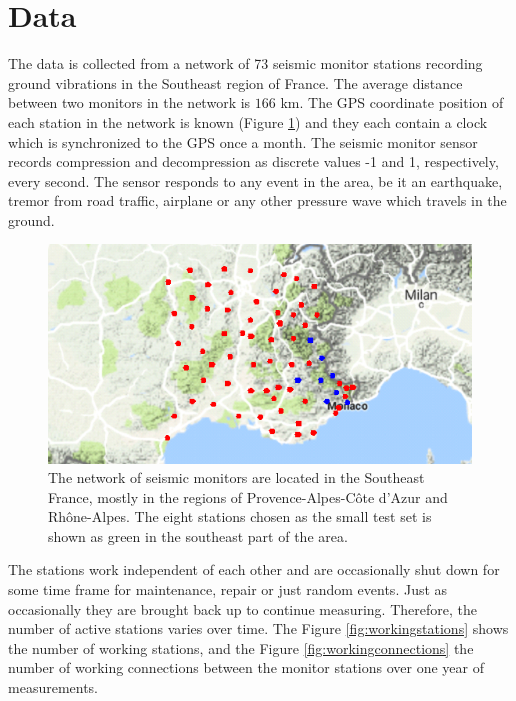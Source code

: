 \documentclass[12pt, sumlimits, intlimits]{article}
\begin{document}
\section{Data}

The data is collected from a network of 73 seismic monitor stations recording ground vibrations in the Southeast region of France. The average distance between two monitors in the network is $166$ km. The GPS coordinate position of each station in the network is known (Figure \ref{fig:monitornetwork}) and they each contain a clock which is synchronized to the GPS once a month. The seismic monitor sensor records compression and decompression as discrete values -1 and 1, respectively, every second. The sensor responds to any event in the area, be it an earthquake, tremor from road traffic, airplane or any other pressure wave which travels in the ground.

\begin{figure}[ht]
	\begin{center}   
		\includegraphics[width=\textwidth]{TestStations_zoom.png}
	\end{center}
	\caption{The network of seismic monitors are located in the Southeast France, mostly in the regions of Provence-Alpes-C\^{o}te d'Azur and Rh\^{o}ne-Alpes. The eight stations chosen as the small test set is shown as green in the southeast part of the area.}\label{fig:monitornetwork}
\end{figure}

The stations work independent of each other and are occasionally shut down for some time frame for maintenance, repair or just random events. Just as occasionally they are brought back up to continue measuring.  Therefore, the number of active stations varies over time. The Figure \ref{fig:workingstations} shows the number of working stations, and the Figure \ref{fig:workingconnections} the number of working connections between the monitor stations over one year of measurements. 
\end{document}
